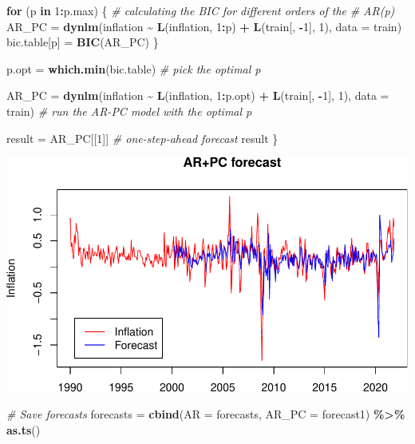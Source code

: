 \documentclass[
]{article}
\newenvironment{Shaded}{\begin{snugshade}}{\end{snugshade}}
\newcommand{\AttributeTok}[1]{\textcolor[rgb]{0.13,0.29,0.53}{#1}}
\newcommand{\CommentTok}[1]{\textcolor[rgb]{0.56,0.35,0.01}{\textit{#1}}}
\newcommand{\ControlFlowTok}[1]{\textcolor[rgb]{0.13,0.29,0.53}{\textbf{#1}}}
\newcommand{\DecValTok}[1]{\textcolor[rgb]{0.00,0.00,0.81}{#1}}
\newcommand{\FunctionTok}[1]{\textcolor[rgb]{0.13,0.29,0.53}{\textbf{#1}}}
\newcommand{\NormalTok}[1]{#1}
\newcommand{\OtherTok}[1]{\textcolor[rgb]{0.56,0.35,0.01}{#1}}
\newcommand{\SpecialCharTok}[1]{\textcolor[rgb]{0.81,0.36,0.00}{\textbf{#1}}}
\begin{document}
\begin{Shaded}
\begin{Highlighting}[]
    \ControlFlowTok{for}\NormalTok{ (p }\ControlFlowTok{in} \DecValTok{1}\SpecialCharTok{:}\NormalTok{p.max) \{}
        \CommentTok{\# calculating the BIC for different orders of the}
        \CommentTok{\# AR(p)}
\NormalTok{        AR\_PC }\OtherTok{=} \FunctionTok{dynlm}\NormalTok{(inflation }\SpecialCharTok{\textasciitilde{}} \FunctionTok{L}\NormalTok{(inflation, }\DecValTok{1}\SpecialCharTok{:}\NormalTok{p) }\SpecialCharTok{+} \FunctionTok{L}\NormalTok{(train[,}
            \SpecialCharTok{{-}}\DecValTok{1}\NormalTok{], }\DecValTok{1}\NormalTok{), }\AttributeTok{data =}\NormalTok{ train)}
\NormalTok{        bic.table[p] }\OtherTok{=} \FunctionTok{BIC}\NormalTok{(AR\_PC)}
\NormalTok{    \}}

\NormalTok{    p.opt }\OtherTok{=} \FunctionTok{which.min}\NormalTok{(bic.table)  }\CommentTok{\# pick the optimal p}

\NormalTok{    AR\_PC }\OtherTok{=} \FunctionTok{dynlm}\NormalTok{(inflation }\SpecialCharTok{\textasciitilde{}} \FunctionTok{L}\NormalTok{(inflation, }\DecValTok{1}\SpecialCharTok{:}\NormalTok{p.opt) }\SpecialCharTok{+} \FunctionTok{L}\NormalTok{(train[,}
        \SpecialCharTok{{-}}\DecValTok{1}\NormalTok{], }\DecValTok{1}\NormalTok{), }\AttributeTok{data =}\NormalTok{ train)  }\CommentTok{\# run the AR{-}PC model with the optimal p}

\NormalTok{    result }\OtherTok{=}\NormalTok{ AR\_PC[[}\DecValTok{1}\NormalTok{]]  }\CommentTok{\# one{-}step{-}ahead forecast}
\NormalTok{    result}
\NormalTok{\}}
\end{Highlighting}
\end{Shaded}

\includegraphics{Trabalho_Econo4_Q2_files/figure-latex/unnamed-chunk-16-1.pdf}

\begin{Shaded}
\begin{Highlighting}[]
\CommentTok{\# Save forecasts}
\NormalTok{forecasts }\OtherTok{=} \FunctionTok{cbind}\NormalTok{(}\AttributeTok{AR =}\NormalTok{ forecasts, }\AttributeTok{AR\_PC =}\NormalTok{ forecast1) }\SpecialCharTok{\%\textgreater{}\%}
    \FunctionTok{as.ts}\NormalTok{()}
\end{Highlighting}
\end{Shaded}
\end{document}
